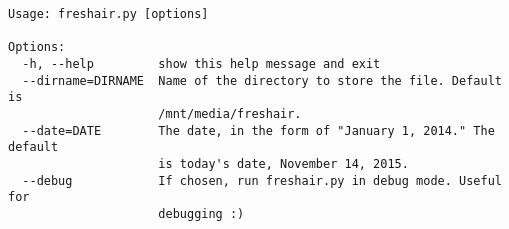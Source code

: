 \begin{verbatim}
Usage: freshair.py [options]

Options:
  -h, --help         show this help message and exit
  --dirname=DIRNAME  Name of the directory to store the file. Default is
                     /mnt/media/freshair.
  --date=DATE        The date, in the form of "January 1, 2014." The default
                     is today's date, November 14, 2015.
  --debug            If chosen, run freshair.py in debug mode. Useful for
                     debugging :)
\end{verbatim}